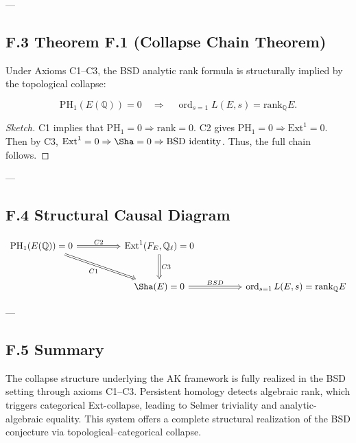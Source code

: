 ---

\subsection*{F.3 Theorem F.1 (Collapse Chain Theorem)}

\begin{theorem}
Under Axioms C1–C3, the BSD analytic rank formula is structurally implied by the topological collapse:

\[
\mathrm{PH}_1(E(\mathbb{Q})) = 0 \quad \Rightarrow \quad \operatorname{ord}_{s=1}L(E,s) = \mathrm{rank}_{\mathbb{Q}}E.
\]
\end{theorem}

\begin{proof}[Sketch]
C1 implies that \( \mathrm{PH}_1 = 0 \Rightarrow \mathrm{rank} = 0 \).  
C2 gives \( \mathrm{PH}_1 = 0 \Rightarrow \mathrm{Ext}^1 = 0 \).  
Then by C3, \( \mathrm{Ext}^1 = 0 \Rightarrow \Sha = 0 \Rightarrow \text{BSD identity} \).  
Thus, the full chain follows.
\end{proof}

---

\subsection*{F.4 Structural Causal Diagram}

\[
\begin{tikzcd}[row sep=large, column sep=huge]
\mathrm{PH}_1(E(\mathbb{Q})) = 0 \arrow[r, Rightarrow, "C2"] \arrow[dr, Rightarrow, swap, "C1"] &
\mathrm{Ext}^1(F_E, \mathbb{Q}_\ell) = 0 \arrow[d, Rightarrow, "C3"] \\
& \Sha(E) = 0 \arrow[r, Rightarrow, "BSD"] & \operatorname{ord}_{s=1}L(E,s) = \mathrm{rank}_{\mathbb{Q}}E
\end{tikzcd}
\]

---

\subsection*{F.5 Summary}

The collapse structure underlying the AK framework is fully realized in the BSD setting through axioms C1–C3.  
Persistent homology detects algebraic rank, which triggers categorical Ext-collapse,  
leading to Selmer triviality and analytic-algebraic equality.  
This system offers a complete structural realization of the BSD conjecture via topological–categorical collapse.



